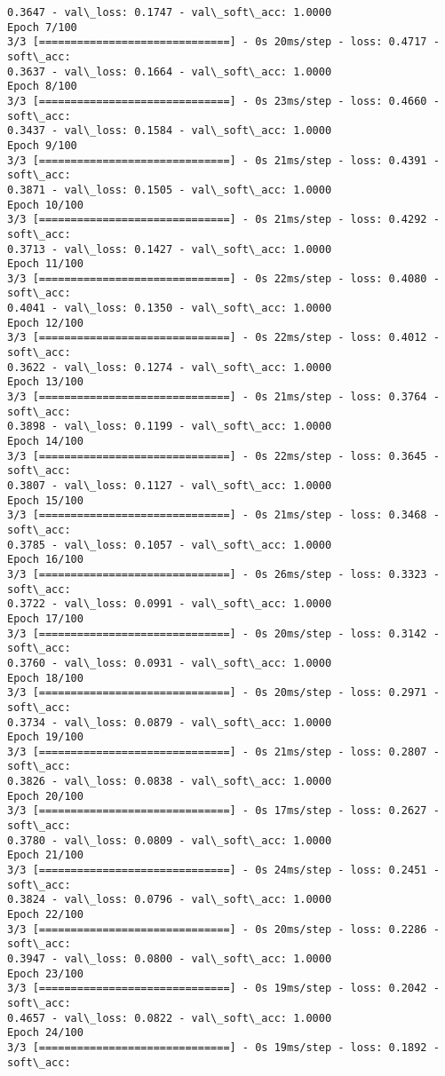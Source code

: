 \documentclass[11pt]{article}
\begin{document}
\begin{Verbatim}[commandchars=\\\{\}]
0.3647 - val\_loss: 0.1747 - val\_soft\_acc: 1.0000
Epoch 7/100
3/3 [==============================] - 0s 20ms/step - loss: 0.4717 - soft\_acc:
0.3637 - val\_loss: 0.1664 - val\_soft\_acc: 1.0000
Epoch 8/100
3/3 [==============================] - 0s 23ms/step - loss: 0.4660 - soft\_acc:
0.3437 - val\_loss: 0.1584 - val\_soft\_acc: 1.0000
Epoch 9/100
3/3 [==============================] - 0s 21ms/step - loss: 0.4391 - soft\_acc:
0.3871 - val\_loss: 0.1505 - val\_soft\_acc: 1.0000
Epoch 10/100
3/3 [==============================] - 0s 21ms/step - loss: 0.4292 - soft\_acc:
0.3713 - val\_loss: 0.1427 - val\_soft\_acc: 1.0000
Epoch 11/100
3/3 [==============================] - 0s 22ms/step - loss: 0.4080 - soft\_acc:
0.4041 - val\_loss: 0.1350 - val\_soft\_acc: 1.0000
Epoch 12/100
3/3 [==============================] - 0s 22ms/step - loss: 0.4012 - soft\_acc:
0.3622 - val\_loss: 0.1274 - val\_soft\_acc: 1.0000
Epoch 13/100
3/3 [==============================] - 0s 21ms/step - loss: 0.3764 - soft\_acc:
0.3898 - val\_loss: 0.1199 - val\_soft\_acc: 1.0000
Epoch 14/100
3/3 [==============================] - 0s 22ms/step - loss: 0.3645 - soft\_acc:
0.3807 - val\_loss: 0.1127 - val\_soft\_acc: 1.0000
Epoch 15/100
3/3 [==============================] - 0s 21ms/step - loss: 0.3468 - soft\_acc:
0.3785 - val\_loss: 0.1057 - val\_soft\_acc: 1.0000
Epoch 16/100
3/3 [==============================] - 0s 26ms/step - loss: 0.3323 - soft\_acc:
0.3722 - val\_loss: 0.0991 - val\_soft\_acc: 1.0000
Epoch 17/100
3/3 [==============================] - 0s 20ms/step - loss: 0.3142 - soft\_acc:
0.3760 - val\_loss: 0.0931 - val\_soft\_acc: 1.0000
Epoch 18/100
3/3 [==============================] - 0s 20ms/step - loss: 0.2971 - soft\_acc:
0.3734 - val\_loss: 0.0879 - val\_soft\_acc: 1.0000
Epoch 19/100
3/3 [==============================] - 0s 21ms/step - loss: 0.2807 - soft\_acc:
0.3826 - val\_loss: 0.0838 - val\_soft\_acc: 1.0000
Epoch 20/100
3/3 [==============================] - 0s 17ms/step - loss: 0.2627 - soft\_acc:
0.3780 - val\_loss: 0.0809 - val\_soft\_acc: 1.0000
Epoch 21/100
3/3 [==============================] - 0s 24ms/step - loss: 0.2451 - soft\_acc:
0.3824 - val\_loss: 0.0796 - val\_soft\_acc: 1.0000
Epoch 22/100
3/3 [==============================] - 0s 20ms/step - loss: 0.2286 - soft\_acc:
0.3947 - val\_loss: 0.0800 - val\_soft\_acc: 1.0000
Epoch 23/100
3/3 [==============================] - 0s 19ms/step - loss: 0.2042 - soft\_acc:
0.4657 - val\_loss: 0.0822 - val\_soft\_acc: 1.0000
Epoch 24/100
3/3 [==============================] - 0s 19ms/step - loss: 0.1892 - soft\_acc:

\end{Verbatim}
\end{document}
